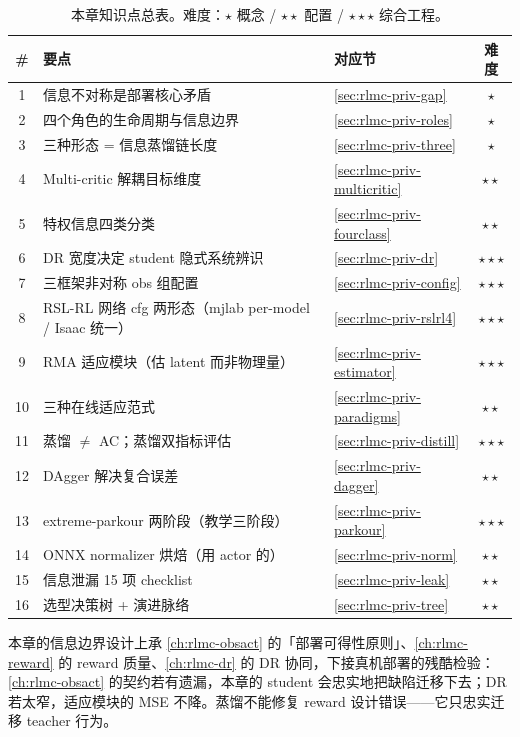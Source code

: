 \begin{table}[H]
\centering
\small
\caption{本章知识点总表。难度：$\star$ 概念 / $\star\star$ 配置 / $\star\star\star$ 综合工程。}
\label{tab:rlmc-priv-knowledge}
\begin{tabular}{@{}clp{5.4cm}c@{}}
\toprule
\# & 要点 & 对应节 & 难度 \\
\midrule
1 & 信息不对称是部署核心矛盾 & \cref{sec:rlmc-priv-gap} & $\star$ \\
2 & 四个角色的生命周期与信息边界 & \cref{sec:rlmc-priv-roles} & $\star$ \\
3 & 三种形态 = 信息蒸馏链长度 & \cref{sec:rlmc-priv-three} & $\star$ \\
4 & Multi-critic 解耦目标维度 & \cref{sec:rlmc-priv-multicritic} & $\star\star$ \\
5 & 特权信息四类分类 & \cref{sec:rlmc-priv-fourclass} & $\star\star$ \\
6 & DR 宽度决定 student 隐式系统辨识 & \cref{sec:rlmc-priv-dr} & $\star\star\star$ \\
7 & 三框架非对称 obs 组配置 & \cref{sec:rlmc-priv-config} & $\star\star\star$ \\
8 & RSL-RL 网络 cfg 两形态（mjlab per-model / Isaac 统一） & \cref{sec:rlmc-priv-rslrl4} & $\star\star\star$ \\
9 & RMA 适应模块（估 latent 而非物理量） & \cref{sec:rlmc-priv-estimator} & $\star\star\star$ \\
10 & 三种在线适应范式 & \cref{sec:rlmc-priv-paradigms} & $\star\star$ \\
11 & 蒸馏 $\ne$ AC；蒸馏双指标评估 & \cref{sec:rlmc-priv-distill} & $\star\star\star$ \\
12 & DAgger 解决复合误差 & \cref{sec:rlmc-priv-dagger} & $\star\star$ \\
13 & extreme-parkour 两阶段（教学三阶段） & \cref{sec:rlmc-priv-parkour} & $\star\star\star$ \\
14 & ONNX normalizer 烘焙（用 actor 的） & \cref{sec:rlmc-priv-norm} & $\star\star$ \\
15 & 信息泄漏 15 项 checklist & \cref{sec:rlmc-priv-leak} & $\star\star$ \\
16 & 选型决策树 + 演进脉络 & \cref{sec:rlmc-priv-tree} & $\star\star$ \\
\bottomrule
\end{tabular}
\end{table}

本章的信息边界设计上承 \cref{ch:rlmc-obsact} 的「部署可得性原则」、\cref{ch:rlmc-reward} 的 reward 质量、\cref{ch:rlmc-dr} 的 DR 协同，下接真机部署的残酷检验：\cref{ch:rlmc-obsact} 的契约若有遗漏，本章的 student 会忠实地把缺陷迁移下去；DR 若太窄，适应模块的 MSE 不降。蒸馏不能修复 reward 设计错误——它只忠实迁移 teacher 行为。

